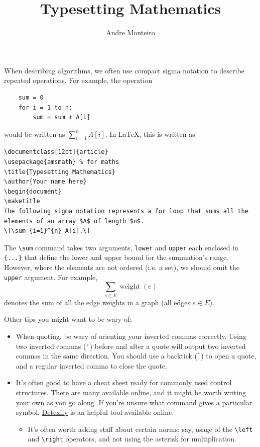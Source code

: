 \documentclass[12pt]{article}
\title{Typesetting Mathematics}
\author{Andre Monteiro}
\begin{document}
\maketitle

When describing algorithms, we often use compact sigma notation to describe repeated operations. For example, the operation
\begin{verbatim}
    sum = 0
    for i = 1 to n:
        sum = sum + A[i]
\end{verbatim}

would be written as $\displaystyle \sum_{i=1}^n A[i]$. In \LaTeX, this is written as
\begin{lstlisting}
\documentclass[12pt]{article}
\usepackage{amsmath} % for maths
\title{Typesetting Mathematics}
\author{Your name here}
\begin{document}
\maketitle
The following sigma notation represents a for loop that sums all the elements of an array $A$ of length $n$.
\[\sum_{i=1}^{n} A[i].\]
\end{lstlisting}

The \verb|\sum| command takes two arguments, \verb|lower| and \verb|upper| each enclosed in \verb|{...}| that define the lower and upper bound for the summation's range. However, where the elements are not ordered (i.e. a set), we should omit the \verb|upper| argument. For example,  \[ \sum_{e \in E} \operatorname{weight}(e) \] denotes the sum of all the edge weights in a graph (all edges $e \in E$).

Other tips you might want to be wary of: 
\begin{itemize}
    \item When quoting, be wary of orienting your inverted commas correctly. Using two inverted commas (\verb|'|) before and after a quote will output two inverted commas in the same direction. You should use a backtick (\verb|`|) to open a quote, and a regular inverted comma to close the quote.
    \item It's often good to have a cheat sheet ready for commonly used control structures. There are many available online, and it might be worth writing your own as you go along. If you're unsure what command gives a particular symbol, \href{https://detexify.kirelabs.org/classify.html}{Detexify} is an helpful tool available online.
    \begin{itemize}
        \item It's often worth asking staff about certain norms; say, usage of the \verb|\left| and \verb|\right| operators, and not using the asterisk for multiplication.
    \end{itemize}
\end{itemize}
\end{document}
